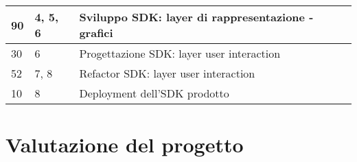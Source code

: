 \begin{center}
\begin{longtable}{|p{2.5cm}|p{2.5cm}|p{7.5cm}|}
        \hline
        90                                 & 4, 5, 6                                          & Sviluppo SDK: layer di  rappresentazione - grafici                              \\
        \hline
        30                                 & 6                                                & Progettazione SDK: layer user interaction                                       \\
        \hline
        52                                 & 7, 8                                             & Refactor SDK: layer user interaction                                            \\
        \hline
        10                                 & 8                                                & Deployment dell'SDK prodotto                                                    \\
    \end{longtable}
    \label{tab:consuntivo_finale}
\end{center}


\section{Valutazione del progetto}

